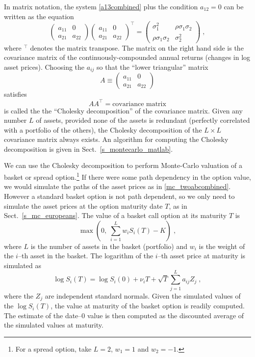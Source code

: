 In matrix notation, the system \eqref{a13combined} plus the condition $a_{12}=0$ can be written as the equation
$$\begin{pmatrix}a_{11} & 0 \\a_{21} & a_{22}\end{pmatrix}\begin{pmatrix}a_{11} & 0 \\a_{21} & a_{22}\end{pmatrix}^\top = \begin{pmatrix}\sigma_1^2 & \rho\sigma_1\sigma_2 \\\rho\sigma_1\sigma_2 & \sigma_2^2\end{pmatrix}\; ,$$
where $^\top$ denotes the matrix transpose.  The matrix on the right hand side is the covariance matrix  of the continuously-compounded annual returns (changes in log asset prices).  Choosing the $a_{ij}$ so that the ``lower triangular'' matrix 
$$A \equiv \begin{pmatrix}a_{11} & 0 \\a_{21} & a_{22}\end{pmatrix}$$
satisfies 
$$AA^\top = \text{covariance matrix}$$
is called the 
the ``Cholesky decomposition'' of the covariance matrix.  Given any number $L$ of assets, provided none of the assets is redundant (perfectly correlated with a portfolio of the  others), the Cholesky decomposition of the $L\times L$ covariance matrix always exists. An algorithm for computing the Cholesky decomposition is given in Sect.~\ref{s_montecarlo_matlab}. 

We can use the Cholesky decomposition to perform Monte-Carlo valuation of a basket or spread option.\footnote{For a spread option, take $L=2$, $w_1=1$ and $w_2=-1$.}  If there were some path dependency in the option value, we would simulate the paths of the asset prices as in \eqref{mc_twoabcombined}.  However a standard basket option is not path dependent, so we only need to simulate the asset prices at the option maturity date $T$, as in Sect.~\ref{s_mc_europeans}.  The value of a basket call option at its maturity $T$ is 
$$\max\left(0,\;\sum_{i=1}^L w_iS_i(T)-K\right)\; ,$$
where $L$ is the number of assets in the basket (portfolio) and $w_i$ is the weight of the $i$--th asset in the basket.
The logarithm of the $i$--th asset price at maturity is simulated as
$$\log S_i(T) = \log S_i(0) +\nu_iT + \sqrt{T} \sum_{j=1}^L a_{ij}Z_j\; ,$$
where the $Z_j$ are independent standard normals.  Given the simulated values of the $\log S_i(T)$, the value at maturity of the basket option is readily computed.  The estimate of the date--0 value is then computed as the discounted average of the simulated values at maturity.  



